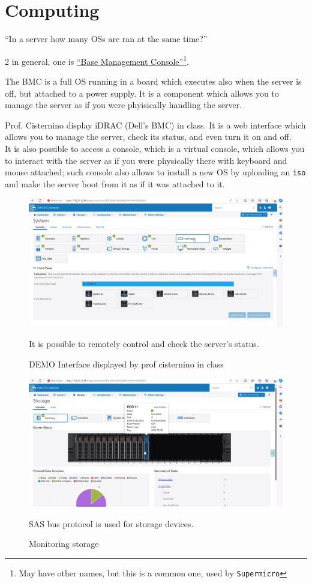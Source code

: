 \chapter{Computing}
\begin{center}
   ``In a server how many OSs are ran at the same time?''
\end{center}
2 in general, one is \ul{``Base Management Console''}\footnote{May have other names, but this is a common one, used by \texttt{Supermicro}}.

The BMC is a full OS running in a board which executes also when the server is off, but attached to a power supply. It is a component which allows you to manage the server as if you were phyisically handling the server.

Prof. Cisternino display iDRAC (Dell's BMC) in class. It is a web interface which allows you to manage the server, check its status, and even turn it on and off. \\
It is also possible to access a console, which is a virtual console, which allows you to interact with the server as if you were physically there with keyboard and mouse attached;
such console also allows to install a new OS by uploading an \texttt{iso} and make the server boot from it as if it was attached to it.
\begin{figure}[htbp]
   \centering
   \includegraphics{images/monitoring_servers.png}
   \caption{DEMO Interface displayed by prof cisternino in class}
   \label{fig:monitoring_servers}
   It is possible to remotely control and check the server's status.
\end{figure}

\begin{figure}[htbp]
   \centering
   \includegraphics{images/monitoring_servers2.png}
   \caption{Monitoring storage}
   \label{fig:monitoring_servers2}
   SAS bus protocol is used for storage devices.
\end{figure}


